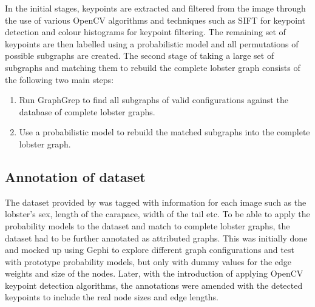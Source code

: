 \noindent
In the initial stages, keypoints are extracted and filtered from the image through the use of various OpenCV algorithms and techniques such as SIFT for keypoint detection and colour histograms for keypoint filtering. The remaining set of keypoints are then labelled using a probabilistic model and all permutations of possible subgraphs are created. 
\n
The second stage of taking a large set of subgraphs and matching them to rebuild the complete lobster graph consists of the following two main steps:
\begin{enumerate}
\item Run GraphGrep to find all subgraphs of valid configurations against the database of complete lobster graphs. 
\item Use a probabilistic model to rebuild the matched subgraphs into the complete lobster graph.
\end{enumerate}


\subsection{Annotation of dataset}\label{sec:annotation}
The dataset provided by \cite{lobster-thesis} was tagged with information for each image such as the lobster's sex, length of the carapace, width of the tail etc. To be able to apply the probability models to the dataset and match to complete lobster graphs, the dataset had to be further annotated as attributed graphs. This was initially done and mocked up using Gephi to explore different graph configurations and test with prototype probability models, but only with dummy values for the edge weights and size of the nodes. Later, with the introduction of applying OpenCV keypoint detection algorithms, the annotations were amended with the detected keypoints to include the real node sizes and edge lengths.


